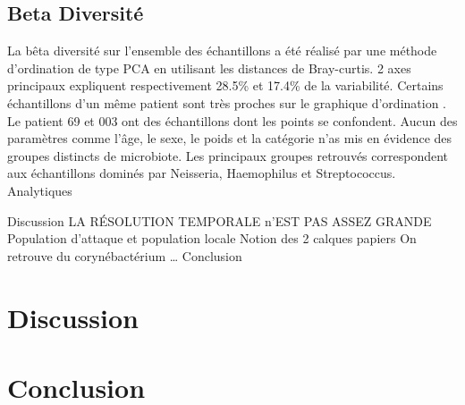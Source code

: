 \documentclass[12pt,a4paper]{article}
\begin{document}
\subsection{Beta Diversité}
La bêta diversité sur l’ensemble des échantillons a été réalisé par une méthode d’ordination de type PCA en utilisant les distances de Bray-curtis.
2 axes principaux expliquent respectivement 28.5\% et 17.4\% de la variabilité.
Certains échantillons d’un même patient sont très proches sur le graphique d’ordination . Le patient 69 et 003 ont des échantillons dont les points se confondent.
Aucun des paramètres comme l’âge, le sexe, le poids et la catégorie n’as mis en évidence des groupes distincts de microbiote.
Les principaux groupes retrouvés correspondent aux échantillons dominés par Neisseria, Haemophilus et Streptococcus.
Analytiques


Discussion
LA RÉSOLUTION TEMPORALE n’EST PAS ASSEZ GRANDE
Population d’attaque et population locale
Notion des 2 calques papiers
On retrouve du corynébactérium …
Conclusion









\section{Discussion}


\section{Conclusion}




\newpage




\end{document}
